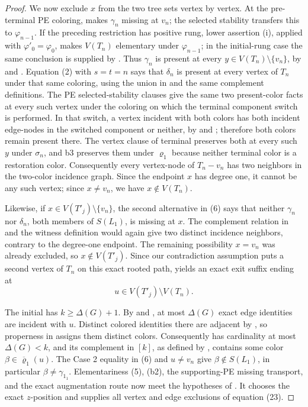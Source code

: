 \begin{proof}
We now exclude \(x\) from the two tree sets vertex by vertex.  At the
pre-terminal PE coloring,  makes
\(\gamma_n\) missing at \(v_n\); the selected stability transfers this
to \(\varphi_{n-1}\).  If the preceding restriction has positive rung,
lower assertion (i), applied with \(\varphi'_0=\varphi_0\), makes
\(V(T_n)\) elementary under \(\varphi_{n-1}\); in the initial-rung case
the same conclusion is supplied by .
Thus \(\gamma_n\) is
present at every \(y\in V(T_n)\setminus\{v_n\}\), by
 and .  Equation (2) with
\(s=t=n\) says that \(\delta_n\) is present at every vertex of \(T_n\)
under that same coloring, using the union in
 and the same complement definitions.  The PE
selected-stability clauses give the same
two present-color facts at every such vertex under the coloring on which
the terminal component switch is performed.  In that switch, a vertex
incident with both colors has both incident edge-nodes in the switched
component or neither, by  and
; therefore both colors remain present there.  The
vertex clause of terminal  preserves both at
every such \(y\) under \(\sigma_n\), and b3 preserves them under
\(\varrho_1\) because neither terminal color is a restoration color.
Consequently every vertex-node of \(T_n-v_n\) has two neighbors in the
two-color incidence graph.  Since the endpoint \(x\) has degree one, it
cannot be any such vertex; since \(x\ne v_n\), we have
\(x\notin V(T_n)\).

Likewise, if \(x\in V(T'_j)\setminus\{v_n\}\), the second alternative in
(6) says that neither \(\gamma_n\) nor \(\delta_n\), both members of
\(S(L_1)\), is missing at \(x\).  The complement relation in
 and the witness definition
 would again give two distinct incidence neighbors,
contrary to the degree-one endpoint.  The remaining possibility
\(x=v_n\) was already excluded, so \(x\notin V(T'_j)\).  Since our
contradiction assumption puts a second vertex of \(T_n\) on this exact
rooted path,
 yields an exact exit suffix
ending at
\[
                         u\in V(T'_j)\setminus V(T_n).       \tag{8}
\]

The initial  has \(k\geq\Delta(G)+1\).  By
 and , at most \(\Delta(G)\)
exact edge identities are incident with \(u\).  Distinct colored
identities there are adjacent by , so properness
in  assigns them distinct colors.
Consequently  has cardinality at most
\(\Delta(G)<k\), and its complement in \([k]\), as defined by
, contains some color
\(\beta\in\overline\varrho_1(u)\).  The Case 2 equality in (6) and
\(u\ne v_n\) give \(\beta\notin S(L_1)\), in particular
\(\beta\ne\gamma_{1_1}\).  Elementariness (5), (b2), the supporting-PE
missing transport, and the exact augmentation route now meet the
hypotheses of .  It chooses
the exact \(z\)-position and supplies all vertex and edge exclusions of
equation (23).


\end{proof}
